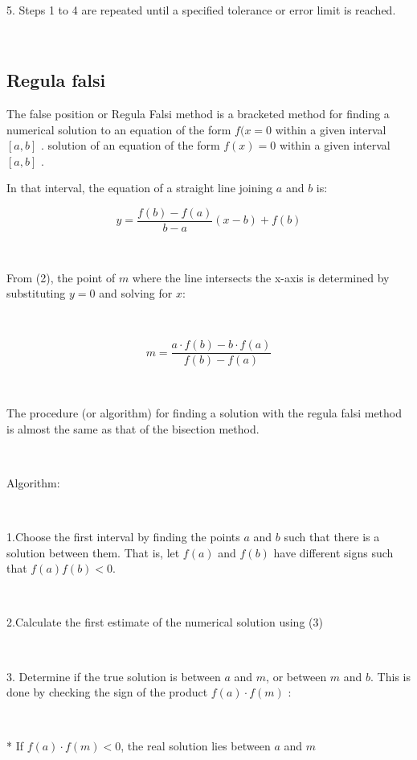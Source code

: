 \documentclass[conference]{IEEEtran}
\begin{document}
\

5. Steps 1 to 4 are repeated until a specified tolerance or error limit is reached.



\

\subsection{Regula falsi}

The false position or Regula Falsi method is a bracketed method for finding a numerical solution to an equation of the form $ f(x = 0 $ within a given interval $ [a, b] $ .
solution of an equation of the form $ f(x) = 0 $ within a given interval $ [a, b] $ .

In that interval, the equation of a straight line joining $ a$ and $ b $ is:


\begin{equation}
 y = \frac{f(b) - f(a)}{b - a} (x - b) + f(b)
\end{equation}

\

From (2), the point of $ m $ where the line intersects the x-axis is determined by substituting $ y = 0 $ and solving for $x$:

\

\begin{equation}
 m = \frac{a\cdot f(b) - b \cdot f(a)}{f(b) - f(a)}
\end{equation}

\

The procedure (or algorithm) for finding a solution with the regula falsi method is almost the same as that of the bisection method.


\


Algorithm:

\

1.Choose the first interval by finding the points $ a$ and $ b $ such that there is a solution between them. That is, let $ f(a) $ and $ f(b) $ have different signs such that $ f(a) f(b) < 0 $.

\

2.Calculate the first estimate of the numerical solution using (3)

\

3. Determine if the true solution is between $ a$ and $ m $, or between $ m $ and $ b $. This is done by checking the sign of the product $ f(a) \cdot f(m) $ :

\
    
	* If $ f(a) \cdot f(m) < 0 $, the real solution lies between $ a$ and $ m $
\end{document}
